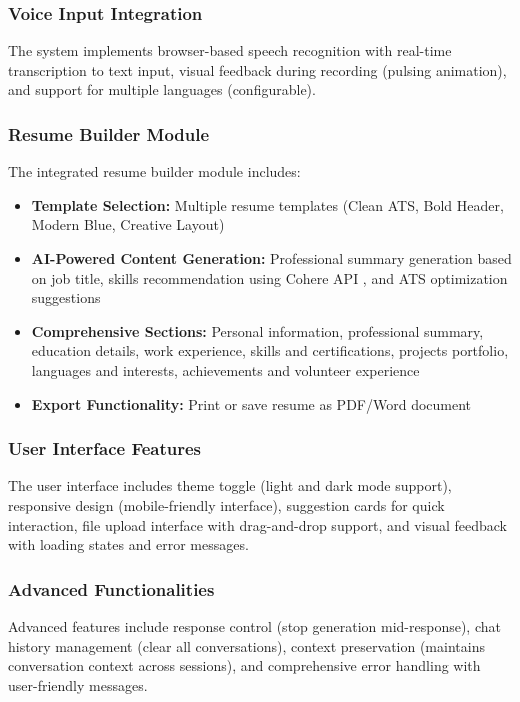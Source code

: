 \documentclass[conference]{IEEEtran}
\begin{document}
\subsubsection{Voice Input Integration}
The system implements browser-based speech recognition with real-time transcription to text input, visual feedback during recording (pulsing animation), and support for multiple languages (configurable).

\subsubsection{Resume Builder Module}
The integrated resume builder module includes:
\begin{itemize}[itemsep=0pt, parsep=0pt, leftmargin=*]
    \item \textbf{Template Selection:} Multiple resume templates (Clean ATS, Bold Header, Modern Blue, Creative Layout)
    \item \textbf{AI-Powered Content Generation:} Professional summary generation based on job title, skills recommendation using Cohere API \cite{cohere2024}, and ATS optimization suggestions
    \item \textbf{Comprehensive Sections:} Personal information, professional summary, education details, work experience, skills and certifications, projects portfolio, languages and interests, achievements and volunteer experience
    \item \textbf{Export Functionality:} Print or save resume as PDF/Word document
\end{itemize}

\subsubsection{User Interface Features}
The user interface includes theme toggle (light and dark mode support), responsive design (mobile-friendly interface), suggestion cards for quick interaction, file upload interface with drag-and-drop support, and visual feedback with loading states and error messages.

\subsubsection{Advanced Functionalities}
Advanced features include response control (stop generation mid-response), chat history management (clear all conversations), context preservation (maintains conversation context across sessions), and comprehensive error handling with user-friendly messages.
\end{document}
